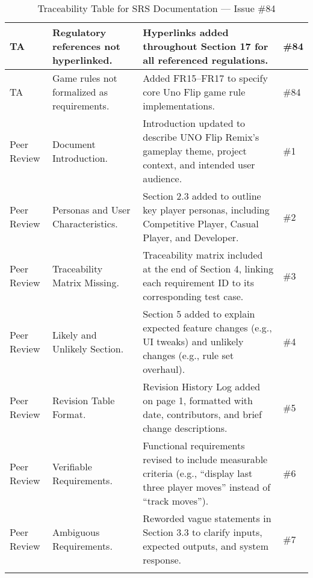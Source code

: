 \documentclass{article}
\begin{document}
\begin{longtable}{|p{2cm}|p{5cm}|p{5cm}|p{2cm}|}
\hline
TA & Regulatory references not hyperlinked. & Hyperlinks added throughout Section 17 for all referenced regulations. & \#84 \\
\hline
TA & Game rules not formalized as requirements. & Added FR15–FR17 to specify core Uno Flip game rule implementations. & \#84 \\
\hline
Peer Review & Document Introduction. & Introduction updated to describe UNO Flip Remix’s gameplay theme, project context, and intended user audience. & \#1 \\
\hline
Peer Review & Personas and User Characteristics. & Section 2.3 added to outline key player personas, including Competitive Player, Casual Player, and Developer. & \#2 \\
\hline
Peer Review & Traceability Matrix Missing. & Traceability matrix included at the end of Section 4, linking each requirement ID to its corresponding test case. & \#3 \\
\hline
Peer Review & Likely and Unlikely Section. & Section 5 added to explain expected feature changes (e.g., UI tweaks) and unlikely changes (e.g., rule set overhaul). & \#4 \\
\hline
Peer Review & Revision Table Format. & Revision History Log added on page 1, formatted with date, contributors, and brief change descriptions. & \#5 \\
\hline
Peer Review & Verifiable Requirements. & Functional requirements revised to include measurable criteria (e.g., “display last three player moves” instead of “track moves”). & \#6 \\
\hline
Peer Review & Ambiguous Requirements. & Reworded vague statements in Section 3.3 to clarify inputs, expected outputs, and system response. & \#7 \\
\hline
\caption{Traceability Table for SRS Documentation — Issue \#84}
\end{longtable}

\vspace{1cm}
\end{document}
